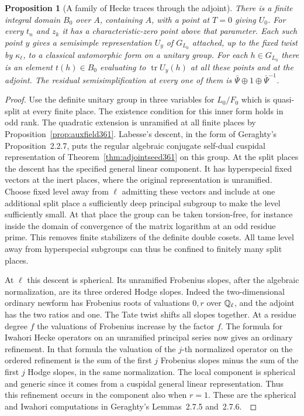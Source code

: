 \documentclass[a4paper,11pt]{article}
\newtheorem{proposition}{Proposition}[section]
\theoremstyle{definition}
\theoremstyle{remark}
\numberwithin{equation}{section}
\begin{document}
\begin{proposition}[A family of Hecke traces through the adjoint]
\label{prop:ordinaryfamily363}
There is a finite integral domain \(B_0\) over \(A\), containing
\(A\), with a point at \(T=0\) giving \(U_0\). For every \(t_n\)
and \(z_k\) it has a characteristic-zero point above that
parameter. Each such point \(y\) gives a semisimple
representation \(U_y\) of \(G_{L_0}\) attached, up to the fixed
twist by \(\kappa_\ell\), to a classical automorphic form on a
unitary group. For each \(h\in G_{L_0}\) there is an element
\(t(h)\in B_0\) evaluating to \(\operatorname{tr} U_y(h)\)
at all these points and at the adjoint. The residual
semisimplification at every one of them is
\(\bar\Psi\oplus1\oplus\bar\Psi^{-1}\).
\end{proposition}
\begin{proof}
Use the definite unitary group in three variables for \(L_0/F_0\)
which is quasi-split at every finite place. The existence condition
for this inner form holds in odd rank. The quadratic extension is
unramified at all finite places by Proposition~\ref{prop:auxfield361}.
Labesse's descent, in the form of Geraghty's Proposition~2.2.7,
puts the regular algebraic conjugate self-dual cuspidal
representation of Theorem~\ref{thm:adjointseed361} on this group.
At the split places the descent has the specified general linear
component. It has hyperspecial fixed vectors at the inert places,
where the original representation is unramified. Choose fixed
level away from \(\ell\) admitting these vectors and include at
one additional split place a sufficiently deep principal subgroup
to make the level sufficiently small. At that place the group
can be taken torsion-free, for instance inside the domain of
convergence of the matrix logarithm at an odd residue prime.
This removes finite stabilizers of the definite double cosets.
All tame level away from hyperspecial subgroups can thus be
confined to finitely many split places.~\cite{VII-V-geraghty363}

At \(\ell\) this descent is spherical. Its unramified
Frobenius slopes, after the algebraic normalization, are its
three ordered Hodge slopes. Indeed the two-dimensional ordinary
newform has Frobenius roots of valuations \(0,r\) over
\(\mathbb Q_\ell\), and the adjoint has the two ratios and one.
The Tate twist shifts all slopes together. At a residue degree
\(f\) the valuations of Frobenius increase by the factor \(f\).
The formula for Iwahori Hecke operators on an unramified
principal series now gives an ordinary refinement. In that
formula the valuation of the \(j\)-th normalized operator on the
ordered refinement is the sum of the first \(j\) Frobenius slopes
minus the sum of the first \(j\) Hodge slopes, in the same
normalization. The local component is spherical and generic
since it comes from a cuspidal general linear representation.
Thus this refinement occurs in the component also when \(r=1\).
These are the spherical and Iwahori computations in Geraghty's
Lemmas~2.7.5 and~2.7.6.~\cite{VII-V-geraghty363}


\end{proof}
\end{document}
